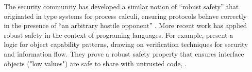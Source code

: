 The security community has developed a similar notion of ``robust safety'' that
originated in type systems for process calculi, ensuring protocols
behave correctly in the presence of ``an arbitrary hostile opponent''
\cite{gordonJefferyRobustSafety,Bugliesi:resource-aware}.  
%
%
%
%
More recent work has applied robust safety in the context of
programing languages.  For example,
\cite{ddd} present a logic
for object capability patterns, drawing 
%
on verification techniques for security and
information flow. They prove a robust safety property that
ensures interface objects ("low values") are safe to share with untrusted code,
 . 
